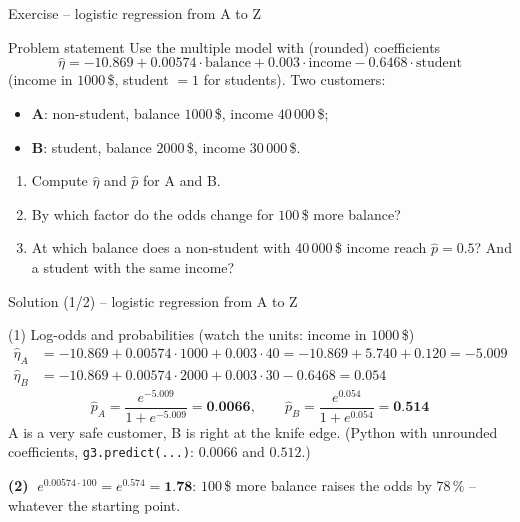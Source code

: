 \documentclass[aspectratio=169,11pt]{beamer}
\begin{document}
\begin{frame}{Exercise -- logistic regression from A to Z}
  \begin{block}{Problem statement}
    Use the multiple model with (rounded) coefficients
    \[
      \hat\eta=-10.869+0.00574\cdot\text{balance}+0.003\cdot\text{income}-0.6468\cdot\text{student}
    \]
    (income in $1000$\,\$, student $=1$ for students). Two customers:
    \begin{itemize}
      \item \textbf{A}: non-student, balance $1000$\,\$, income $40\,000$\,\$;
      \item \textbf{B}: student, balance $2000$\,\$, income $30\,000$\,\$.
    \end{itemize}
    \begin{enumerate}
      \item Compute $\hat\eta$ and $\hat p$ for A and B.
      \item By which factor do the odds change for $100$\,\$ more balance?
      \item At which balance does a non-student with $40\,000$\,\$ income
            reach $\hat p=0.5$? And a student with the same income?
    \end{enumerate}
  \end{block}
\end{frame}

\begin{frame}{Solution (1/2) -- logistic regression from A to Z}
  \begin{exampleblock}{(1) Log-odds and probabilities (watch the units: income in $1000$\,\$)}
    \begin{align*}
      \hat\eta_A&=-10.869+0.00574\cdot1000+0.003\cdot40=-10.869+5.740+0.120=-5.009\\
      \hat\eta_B&=-10.869+0.00574\cdot2000+0.003\cdot30-0.6468=0.054
    \end{align*}
    \[
      \hat p_A=\frac{e^{-5.009}}{1+e^{-5.009}}=\textbf{0.0066},
      \qquad
      \hat p_B=\frac{e^{0.054}}{1+e^{0.054}}=\textbf{0.514}
    \]
    A is a very safe customer, B is right at the knife edge. (Python
    with unrounded coefficients, \texttt{g3.predict(...)}: $0.0066$ and $0.512$.)
  \end{exampleblock}
  \textbf{(2)} $\;e^{0.00574\cdot100}=e^{0.574}=\textbf{1.78}$: $100$\,\$ more
  balance raises the odds by $78\,\%$ -- whatever the starting point.
\end{frame}
\end{document}
